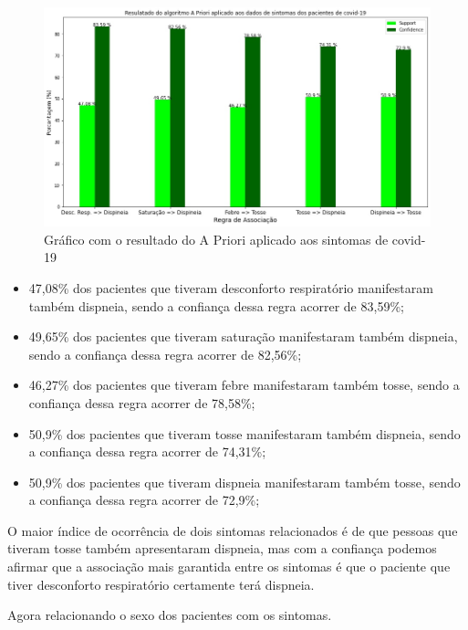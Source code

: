 \documentclass[tcc1]{uftex}
\begin{document}
    \begin{figure}[!h]
    \centering
    \includegraphics[width=13cm]{AprioriIMG.jpg}
    \caption{Gráfico com o resultado do A Priori aplicado aos sintomas de covid-19}
    \end{figure}
    
    \begin{itemize}
    \item 47,08\% dos pacientes que tiveram desconforto respiratório manifestaram também dispneia, sendo a confiança dessa regra acorrer de 83,59\%;
    
    \item 49,65\% dos pacientes que tiveram saturação manifestaram também dispneia, sendo a confiança dessa regra acorrer de 82,56\%;
    
    \item 46,27\% dos pacientes que tiveram febre manifestaram também tosse, sendo a confiança dessa regra acorrer de 78,58\%;
    
    \item 50,9\% dos pacientes que tiveram tosse manifestaram também dispneia, sendo a confiança dessa regra acorrer de 74,31\%;
    
    \item 50,9\% dos pacientes que tiveram dispneia manifestaram também tosse, sendo a confiança dessa regra acorrer de 72,9\%;
    \end{itemize}
    
    O maior índice de ocorrência de dois sintomas relacionados é de que pessoas que tiveram tosse também apresentaram dispneia, mas com a confiança podemos afirmar que a associação mais garantida entre os sintomas é que o paciente que tiver desconforto respiratório certamente terá dispneia.
    
    Agora relacionando o sexo dos pacientes com os sintomas.
    
\end{document}
